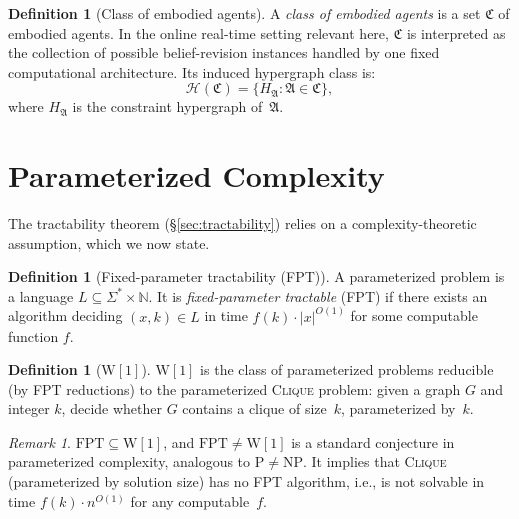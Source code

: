 \documentclass[11pt,a4paper]{article}
\theoremstyle{plain}
\theoremstyle{definition}
\newtheorem{definition}[theorem]{Definition}
\theoremstyle{remark}
\newtheorem{remark}[theorem]{Remark}
\begin{document}
\begin{definition}[Class of embodied agents]\label{def:agent-class}
A \emph{class of embodied agents} is a set $\mathfrak{C}$ of embodied agents.
In the online real-time setting relevant here, $\mathfrak{C}$ is interpreted as the collection of possible belief-revision instances handled by one fixed computational architecture.
Its induced hypergraph class is:
\[
  \mathcal{H}(\mathfrak{C}) = \{ H_{\mathfrak{A}} : \mathfrak{A} \in \mathfrak{C} \},
\]
where $H_{\mathfrak{A}}$ is the constraint hypergraph of~$\mathfrak{A}$.
\end{definition}

\section{Parameterized Complexity}\label{sec:complexity}

The tractability theorem (\S\ref{sec:tractability}) relies on a complexity-theoretic assumption, which we now state.

\begin{definition}[Fixed-parameter tractability (FPT)]\label{def:fpt}
A parameterized problem is a language $L \subseteq \Sigma^* \times \mathbb{N}$.
It is \emph{fixed-parameter tractable} (FPT) if there exists an algorithm deciding $(x, k) \in L$ in time $f(k) \cdot |x|^{O(1)}$ for some computable function $f$.
\end{definition}

\begin{definition}[{$\mathrm{W}[1]$}]\label{def:w1}
$\mathrm{W}[1]$ is the class of parameterized problems reducible (by FPT reductions) to the parameterized \textsc{Clique} problem: given a graph $G$ and integer $k$, decide whether $G$ contains a clique of size~$k$, parameterized by~$k$.
\end{definition}

\begin{remark}\label{rem:fpt-conj}
$\mathrm{FPT} \subseteq \mathrm{W}[1]$, and $\mathrm{FPT} \neq \mathrm{W}[1]$ is a standard conjecture in parameterized complexity, analogous to $\mathrm{P} \neq \mathrm{NP}$.
It implies that \textsc{Clique} (parameterized by solution size) has no FPT algorithm, i.e., is not solvable in time $f(k) \cdot n^{O(1)}$ for any computable~$f$.
\end{remark}

\end{document}
